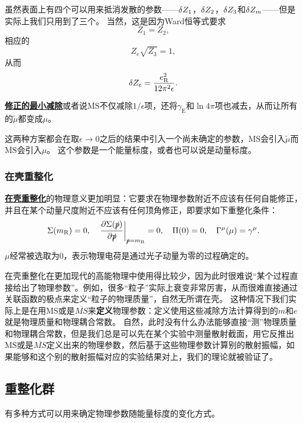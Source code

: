 \documentclass[hyperref, UTF8, a4paper]{ctexart}
\newcommand{\concept}[1]{\underline{\textbf{#1}}}
\renewcommand{\emph}{\textbf}
\begin{document}
虽然表面上有四个可以用来抵消发散的参数——$\var{Z_1}$，$\var{Z_2}$，$\var{Z_3}$和$\var{Z_m}$——但是实际上我们只用到了三个。
当然，这是因为Ward恒等式要求
\[
    Z_1 = Z_2,
\]
相应的
\begin{equation}
    Z_e \sqrt{Z_3} = 1,
\end{equation}
从而
\begin{equation}
    \var{Z_e} = \frac{e_\text{R}^2}{12 \pi^2 \epsilon}.
\end{equation}

\concept{修正的最小减除}或者说$\overline{\mathrm{MS}}$不仅减除$1/\epsilon$项，还将$\gamma_\text{E}$和$\ln 4\pi$项也减去，从而让所有的$\tilde{\mu}$都变成$\mu$。

这两种方案都会在取$\epsilon \to 0$之后的结果中引入一个尚未确定的参数，MS会引入$\tilde{\mu}$而$\overline{\mathrm{MS}}$会引入$\mu$。
这个参数是一个能量标度，或者也可以说是动量标度。

\subsubsection{在壳重整化}

\concept{在壳重整化}的物理意义更加明显：它要求在物理参数附近不应该有任何自能修正，并且在某个动量尺度附近不应该有任何顶角修正，即要求如下重整化条件：
\begin{equation}
    \Sigma(m_\text{R}) = 0, \quad \eval{\pdv{\Sigma(\slashed{p})}{\slashed{p}}}_{\slashed{p} = m_\text{R}} = 0, \quad \Pi(0) = 0, \quad \Gamma^\mu(\mu) = \gamma^\mu.
\end{equation}
$\mu$经常被选取为$0$，表示物理电荷是通过光子动量为零的过程确定的。

在壳重整化在更加现代的高能物理中使用得比较少，因为此时很难说“某个过程直接给出了物理参数”。例如，很多“粒子”实际上衰变非常厉害，从而很难直接通过关联函数的极点来定义“粒子的物理质量”，自然无所谓在壳。
这种情况下我们实际上是在用MS或是$\overline{MS}$来\emph{定义}物理参数：定义使用这些减除方法计算得到的$m$和$e$就是物理质量和物理耦合常数。
自然，此时没有什么办法能够直接“测”物理质量和物理耦合常数，但是我们总是可以先在某个实验中测量散射截面，用它反推出MS或是$\overline{MS}$定义出来的物理参数，然后基于这些物理参数计算别的散射振幅，如果能够和这个别的散射振幅对应的实验结果对上，我们的理论就被验证了。

\subsection{重整化群}

有多种方式可以用来确定物理参数随能量标度的变化方式。
\end{document}
